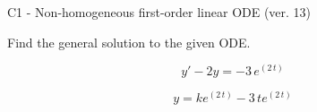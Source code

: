 \begin{exercise}
  \begin{exerciseTitle}C1 - Non-homogeneous first-order linear ODE (ver. 13)\end{exerciseTitle}
  \begin{exerciseStatement}
    
Find the general solution to the given ODE.

    
\[y'-2y= -3 \, e^{\left(2 \, t\right)}\]

  \end{exerciseStatement}
  \begin{exerciseAnswer}
    
\[y= k e^{\left(2 \, t\right)} - 3 \, t e^{\left(2 \, t\right)}\]

  \end{exerciseAnswer}
\end{exercise}